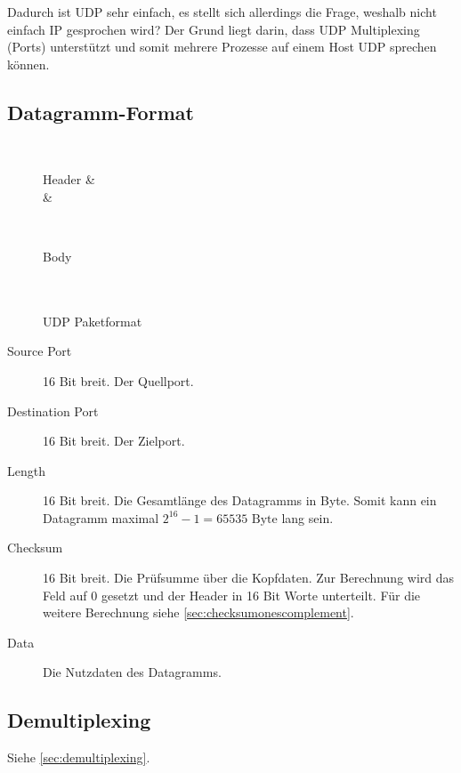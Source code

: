 		Dadurch ist UDP sehr einfach, es stellt sich allerdings die Frage, weshalb nicht einfach IP gesprochen wird? Der Grund liegt darin, dass UDP Multiplexing (Ports) unterstützt und somit mehrere Prozesse auf einem Host UDP sprechen können.

		\subsection{Datagramm-Format}
			\begin{figure}[H]
				\centering
				\begin{bytefield}[bitwidth = 1.2em]{32}
					 \\
					\begin{rightwordgroup}{Header}
						 &  \\
						 & 
					\end{rightwordgroup} \\
					\begin{rightwordgroup}{Body}
						\bitbox[trl]{32}{} \\
						\bitbox[rl]{32}{Data} \\
						\bitbox[rbl]{32}{} \\
					\end{rightwordgroup}
				\end{bytefield}
				\caption{UDP Paketformat}
				\label{fig:udppacket}
			\end{figure}

			\begin{description}
				\item[Source Port] 16 Bit breit. Der Quellport.
				\item[Destination Port] 16 Bit breit. Der Zielport.
				\item[Length] 16 Bit breit. Die Gesamtlänge des Datagramms in Byte. Somit kann ein Datagramm maximal \( 2 ^ 16 - 1 = 65535\text{ Byte} \) lang sein.
				\item[Checksum] 16 Bit breit. Die Prüfsumme über die Kopfdaten. Zur Berechnung wird das Feld auf 0 gesetzt und der Header in 16 Bit Worte unterteilt. Für die weitere Berechnung siehe \ref{sec:checksumonescomplement}.
				\item[Data] Die Nutzdaten des Datagramms.
			\end{description}

		\subsection{Demultiplexing} %
			Siehe \ref{sec:demultiplexing}.

